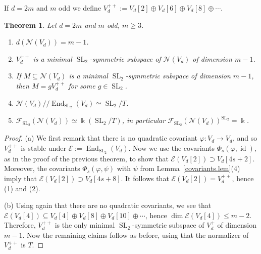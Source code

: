 \documentclass{amsart}
\newtheorem{thm}{Theorem}[section]
\theoremstyle{definition}
\theoremstyle{remark}
\begin{document}
If $d = 2m$ and $m$ odd we define $V_{d}^{++}:=V_{d}[2] \oplus V_{d}[6] \oplus V_{d}[8] \oplus \cdots$.
\begin{thm} Let $d =2m$ and $m$ odd, $m\geq 3$.
\begin{enumerate}
\item $d({\mathcal N}(V_{d})) = m-1$.
\item $V_{d}^{++}$ is a minimal ${\operatorname{SL}_{2}}$-symmetric subspace of ${\mathcal N}(V_{d})$ of dimension $m-1$.
\item If $M {\subseteq} {\mathcal N}(V_{d})$ is a minimal ${\operatorname{SL}_{2}}$-symmetric subspace of dimension $m-1$, then $M = gV_{d}^{++}$ for some $g \in{\operatorname{SL}_{2}}$.
\item ${\mathcal N}(V_{d}){/\!\!/} \operatorname{End}_{\operatorname{SL}_{2}}(V_{d}) \simeq {\operatorname{SL}_{2}}/T$.
\item ${\mathcal F}_{\operatorname{SL}_{2}}({\mathcal N}(V_{d})) \simeq {\Bbbk}({\operatorname{SL}_{2}}/T)$, in particular ${\mathcal F}_{\operatorname{SL}_{2}}({\mathcal N}(V_{d}))^{\operatorname{SL}_{2}} ={\Bbbk}$.
\end{enumerate}
\end{thm}
\begin{proof}
(a) We first remark that there is no quadratic covariant ${\varphi}\colon V_{d}\to V_{d}$, and so $V_{d}^{++}$ is stable under ${\mathcal E}:=\operatorname{End}_{\operatorname{SL}_{2}}(V_{d})$. Now we use the covariants $\Phi_{s}({\varphi},\operatorname{id})$, as in the proof of the previous theorem, to show that ${\mathcal E} (V_{d}[2]) \supset V_{d}[4s+2]$. Moreover, the covariants $\Phi_{s}({\varphi},\psi)$ with $\psi$ from Lemma~\ref{covariants.lem}(4) imply that ${\mathcal E}(V_{d}[2]) \supset V_{d}[4s+8]$. It follows that ${\mathcal E} (V_{d}[2]) = V_{d}^{++}$, hence (1) and (2). 
\par\smallskip
(b) Using again that there are no quadratic covariants, we see that ${\mathcal E} (V_{d}[4]) \subseteq V_{d}[4] \oplus V_{d}[8] \oplus V_{d}[10]\oplus\cdots$, hence 
$\dim {\mathcal E} (V_{d}[4]) \leq m-2$. Therefore, $V_{d}^{++}$ is the only minimal ${\operatorname{SL}_{2}}$-symmetric subspace of $V_{d}^{+}$ of dimension $m-1$. Now the remaining claims follow as before, using that the normalizer of $V_{d}^{++}$ is $T$.
\end{proof}
\end{document}
